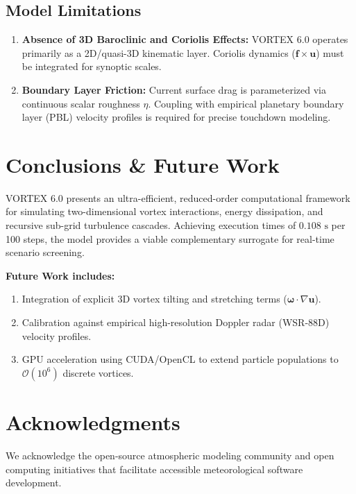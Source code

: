 \documentclass[11pt, a4paper]{article}
\begin{document}
\subsection{Model Limitations}

\begin{enumerate}
    \item \textbf{Absence of 3D Baroclinic and Coriolis Effects:} VORTEX 6.0 operates primarily as a 2D/quasi-3D kinematic layer. Coriolis dynamics ($\mathbf{f} \times \mathbf{u}$) must be integrated for synoptic scales.
    \item \textbf{Boundary Layer Friction:} Current surface drag is parameterized via continuous scalar roughness $\eta$. Coupling with empirical planetary boundary layer (PBL) velocity profiles is required for precise touchdown modeling.
\end{enumerate}

\section{Conclusions \& Future Work}

VORTEX 6.0 presents an ultra-efficient, reduced-order computational framework for simulating two-dimensional vortex interactions, energy dissipation, and recursive sub-grid turbulence cascades. Achieving execution times of $0.108\text{ s}$ per 100 steps, the model provides a viable complementary surrogate for real-time scenario screening.

\textbf{Future Work includes:}
\begin{enumerate}[label=\arabic*.]
    \item Integration of explicit 3D vortex tilting and stretching terms ($\boldsymbol{\omega} \cdot \nabla \mathbf{u}$).
    \item Calibration against empirical high-resolution Doppler radar (WSR-88D) velocity profiles.
    \item GPU acceleration using CUDA/OpenCL to extend particle populations to $\mathcal{O}(10^6)$ discrete vortices.
\end{enumerate}

\section*{Acknowledgments}
We acknowledge the open-source atmospheric modeling community and open computing initiatives that facilitate accessible meteorological software development.
\end{document}
